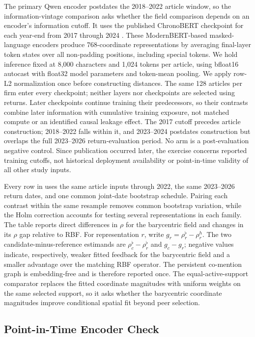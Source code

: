 The primary Qwen encoder postdates the 2018--2022 article window, so the
information-vintage comparison asks whether the field comparison depends on an
encoder's information cutoff.
It uses the published ChronoBERT checkpoint for each year-end from 2017 through
2024 \citep{he_chronobert_2025}.
These ModernBERT-based masked-language encoders produce 768-coordinate
representations by averaging final-layer token states over all non-padding
positions, including special tokens.
We hold inference fixed at 8,000 characters and 1,024 tokens per article,
using bfloat16 autocast with float32 model parameters and token-mean pooling.
We apply row-L2 normalization once before constructing distances.
The same 128 articles per firm enter every checkpoint; neither layers nor
checkpoints are selected using returns.
Later checkpoints continue training their predecessors, so their contrasts
combine later information with cumulative training exposure, not matched
compute or an identified causal leakage effect.
The 2017 cutoff precedes article construction; 2018--2022 falls within it,
and 2023--2024 postdates construction but overlaps the full 2023--2026
return-evaluation period.
No arm is a post-evaluation negative control.
Since publication occurred later, the exercise concerns reported training
cutoffs, not historical deployment availability or point-in-time validity
of all other study inputs.

Every row in  uses the same article inputs
through 2022, the same 2023--2026 return dates, and one common joint-date
bootstrap schedule.
Pairing each contrast within the same resample removes common bootstrap
variation, while the Holm correction accounts for testing several
representations in each family.
The table reports direct differences in $\rho$ for the barycentric field and
changes in its $\rho$ gap relative to RBF.
For representation $r$, write
$g_r=\rho^\flat_r-\rho^h_r$.
The two candidate-minus-reference estimands are
$\rho^\flat_c-\rho^\flat_r$ and $g_c-g_r$; negative values indicate,
respectively, weaker fitted feedback for the barycentric field and a smaller
advantage over the matching RBF operator.
The persistent co-mention graph is embedding-free and is therefore reported
once.
The equal-active-support comparator replaces the fitted coordinate magnitudes
with uniform weights on the same selected support, so it asks whether the
barycentric coordinate magnitudes improve conditional spatial fit beyond peer
selection.

\subsection{Point-in-Time Encoder Check}
\label{sec:p5-point-in-time}

